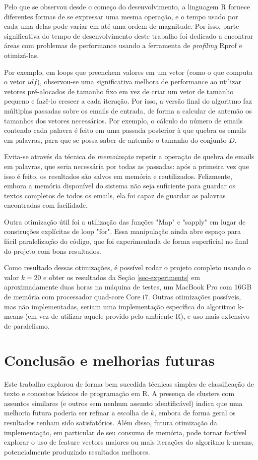 \documentclass[10pt,twocolumn,letterpaper]{article}
\begin{document}
Pelo que se observou desde o começo do desenvolvimento, a linguagem R fornece diferentes formas de se expressar uma mesma operação, e o tempo usado por cada uma delas pode variar em até uma ordem de magnitude. Por isso, parte significativa do tempo de desenvolvimento deste trabalho foi dedicado a encontrar áreas com problemas de performance usando a ferramenta de \emph{profiling} Rprof e otimizá-las.

Por exemplo, em loops que preenchem valores em um vetor (como o que computa o vetor $idf$), observou-se uma significativa melhora de performance ao utilizar vetores pré-alocados de tamanho fixo em vez de criar um vetor de tamanho pequeno e fazê-lo crescer a cada iteração. Por isso, a versão final do algoritmo faz múltiplas passadas sobre os emails de entrada, de forma a calcular de antemão os tamanhos dos vetores necessários. Por exemplo, o cálculo do número de emails contendo cada palavra é feito em uma passada posterior à que quebra os emails em palavras, para que se possa saber de antemão o tamanho do conjunto $D$.

Evita-se através da técnica de \emph{memoização} repetir a operação de quebra de emails em palavras, que seria necessária por todas as passadas: após a primeira vez que isso é feito, os resultados são salvos em memória e reutilizados. Felizmente, embora a memória disponível do sistema não seja suficiente para guardar os textos completos de todos os emails, ela foi capaz de guardar as palavras encontradas com facilidade.

Outra otimização útil foi a utilização das funções "Map" e "sapply" em lugar de construções explícitas de loop "for". Essa manipulação ainda abre espaço para fácil paralelização do código, que foi experimentada de forma superficial no final do projeto com bons resultados.

Como resultado dessas otimizações, é possível rodar o projeto completo usando o valor $k = 20$ e obter os resultados da Seção \ref{sec-experiments} em aproximadamente duas horas na máquina de testes, um MacBook Pro com 16GB de memória com processador quad-core Core i7. Outras otimizações possíveis, mas não implementadas, seriam uma implementação específica do algoritmo k-means (em vez de utilizar aquele provido pelo ambiente R), e uso mais extensivo de paralelismo.

\section{Conclusão e melhorias futuras}
Este trabalho explorou de forma bem sucedida técnicas simples de classificação de texto e conceitos básicos de programação em R. A presença de clusters com assuntos similares (e outros sem nenhum assunto identificável) indica que uma melhoria futura poderia ser refinar a escolha de $k$, embora de forma geral os resultados tenham sido satisfatórios. Além disso, futura otimização da implementação, em particular de seu consumo de memória, pode tornar factível explorar o uso de feature vectors maiores ou mais iterações do algoritmo k-means, potencialmente produzindo resultados melhores.

{\small


}
\end{document}
